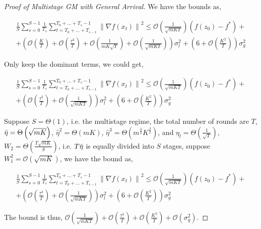 \begin{proof}[Proof of Multistage GM with General Arrival]
We have the bounds as,

\begin{equation}
\begin{gathered}
 \frac{1}{S}\sum_{s=0}^{S-1} \frac{1}{T_s}\sum_{t=T_0+\dots+T_{s-1} }^{T_0+\dots+T_s-1} \left\|\nabla f(x_t)\right\|^2
\leq \mathcal{O}\left(\frac{1}{\sqrt{mKT}}\right) \left(f(z_0) - f^\ast  \right) + \\
+\left( \mathcal{O}\left(\frac{K}{T}\right) + \mathcal{O}\left(\frac{\tau^2}{T}\right) + \mathcal{O}\left(\frac{1}{mK\sqrt{T}}\right) + \mathcal{O}\left(\frac{1}{\sqrt{mKT}}\right) \right)\sigma_l^2 + \left(6 + \mathcal{O}\left( \frac{K^2}{T} \right) \right)\sigma_g^2
\end{gathered}\nonumber
\end{equation}

Only keep the dominant terms, we could get,


\begin{equation}
\begin{gathered}
 \frac{1}{S}\sum_{s=0}^{S-1} \frac{1}{T_s}\sum_{t=T_0+\dots+T_{s-1} }^{T_0+\dots+T_s-1} \left\|\nabla f(x_t)\right\|^2
\leq \mathcal{O}\left(\frac{1}{\sqrt{mKT}}\right) \left(f(z_0) - f^\ast  \right) + \\
+\left( \mathcal{O}\left(\frac{\tau^2}{T}\right) + \mathcal{O}\left(\frac{1}{\sqrt{mKT}} \right) \right)\sigma_l^2 + \left(6 + \mathcal{O}\left( \frac{K^2}{T} \right) \right)\sigma_g^2
\end{gathered}\nonumber
\end{equation}


Suppose $S=\Theta(1)$, i.e. the multistage regime, the total number of rounds are $T$, $\Bar{\eta} = \Theta\left(\sqrt{mK}\right)$, $\hat{\eta}^2 = \Theta\left(mK\right)$, $\hat{\eta}^3 = \Theta\left(m^{\frac{3}{2}} K^{\frac{3}{2}}\right)$, and  $\eta_l=\Theta\left(\frac{1}{\sqrt{T}}\right)$, $W_2=\Theta\left(\frac{T\sqrt{mK}}{S}\right)$, i.e. $T\Bar{\eta}$ is equally divided into $S$ stages, suppose $W_1^2=\mathcal{O}\left(\sqrt{mK}\right)$, we have the bound as,

\begin{equation}
\begin{gathered}
 \frac{1}{S}\sum_{s=0}^{S-1} \frac{1}{T_s}\sum_{t=T_0+\dots+T_{s-1} }^{T_0+\dots+T_s-1} \left\|\nabla f(x_t)\right\|^2
\leq \mathcal{O}\left(\frac{1}{\sqrt{mKT}}\right) \left(f(z_0) - f^\ast  \right) + \\
+\left( \mathcal{O}\left(\frac{\tau^2}{T}\right) + \mathcal{O}\left(\frac{1}{\sqrt{mKT}} \right) \right)\sigma_l^2 + \left(6 + \mathcal{O}\left( \frac{K^2}{T} \right) \right)\sigma_g^2
\end{gathered}\nonumber
\end{equation}

The bound is thus, $\mathcal{O}\left(\frac{1}{\sqrt{mKT}}\right)+ \mathcal{O}\left(\frac{\tau^2}{T}\right) +  \mathcal{O}\left( \frac{K^2}{T} \right) + \mathcal{O}\left( \sigma_g^2 \right)$.

\end{proof}




